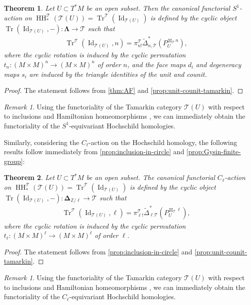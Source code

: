 \documentclass[11pt]{amsart}
\numberwithin{equation}{section}
\theoremstyle{plain}
\newtheorem{Thm}{Theorem}[section]
\theoremstyle{definition}
\theoremstyle{remark}
\newtheorem{RMK}[rmk]{Remark}
\newcommand{\bZ} { {\mathbb{Z}}}
\newcommand{\sT} { {\mathscr{T}}}
\newcommand{\Id}{{\operatorname{Id}}}
\newcommand\HH{\operatorname{HH}}
\newcommand\Tr{\operatorname{Tr}}
\begin{document}
\begin{Thm}\label{thm:S1-action}
    Let $U \subset T^*M$ be an open subset. Then the canonical functorial $S^1$-action on $\HH_*^\sT(\sT(U)) = \Tr^\sT(\Id_{\sT(U)})$ is defined by the cyclic object $\Tr(\Id_{\sT(U)}, -): \boldsymbol{\Lambda} \to \sT$ such that
    \begin{align}\label{eq:trace-circle}
    \Tr^\sT(\Id_{\sT(U)}, n) = \pi_{n!}^\sT\widetilde{\Delta}_{n,\sT}^*(P_U^{\boxtimes_\sT n}),
    \end{align}
    where the cyclic rotation is induced by the cyclic permutation $t_n: (M \times M)^{n} \to (M \times M)^{n}$ of order $n$, and the face maps $d_i$ and degeneracy maps $s_i$ are induced by the triangle identities of the unit and counit.
\end{Thm}
\begin{proof}
    The statement follows from \autoref{thm:AF} and \autoref{prop:unit-counit-tamarkin}.
\end{proof}
\begin{RMK}
    Using the functoriality of the Tamarkin category $\sT(U)$ with respect to inclusions and Hamiltonian homeomorphisms \cite{asanoike2022complete,guillermouviterbo_gammasupport}, we can immediately obtain the functoriality of the $S^1$-equivariant Hochschild homologies.
\end{RMK}

Similarly, considering the $C_\ell$-action on the Hochschild homology, the following results follow immediately from \autoref{prop:inclusion-in-circle} and  \autoref{prop:Gysin-finite-group}:

\begin{Thm}\label{thm:Z/ell-action}
    Let $U \subset T^*M$ be an open subset. The canonical functorial $C_\ell$-action on $\HH_*^\sT(\sT(U)) = \Tr^\sT(\Id_{\sT(U)})$ is defined by the cyclic object $\Tr(\Id_{\sT(U)}, -): \boldsymbol{\Delta}_{\bZ/\ell} \to \sT$ such that
    \begin{align}\label{eq:trace-finite-group}
    \Tr^\sT(\Id_{\sT(U)}, \ell) = \pi_{\ell!}^\sT\widetilde{\Delta}_{\ell\sT}^*(P_U^{\boxtimes_\sT \ell}),
    \end{align}
    where the cyclic rotation is induced by the cyclic permutation $t_\ell: (M \times M)^{\ell} \to (M \times M)^{\ell}$ of order $\ell$. 
\end{Thm}
\begin{proof}
    The statement follows from \autoref{prop:inclusion-in-circle} and \autoref{prop:unit-counit-tamarkin}.
\end{proof}
\begin{RMK}
    Using the functoriality of the Tamarkin category $\sT(U)$ with respect to inclusions and Hamiltonian homeomorphisms \cite{asanoike2022complete,guillermouviterbo_gammasupport}, we can immediately obtain the functoriality of the $C_\ell$-equivariant Hochschild homologies.
\end{RMK}
\end{document}
